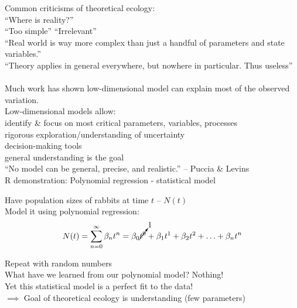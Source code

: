 \documentclass{article}
\newcommand{\note}[1]{\colorbox{gray!20}{#1}}
\begin{document}
Common criticisms of theoretical ecology:\\
\-\hspace{1cm}``Where is reality?''\\
\-\hspace{1cm}``Too simple'' ``Irrelevant''\\
\-\hspace{1cm}``Real world is way more complex than just a handful of parameters and state variables.''\\
\-\hspace{1cm}``Theory applies in general everywhere, but nowhere in particular.  Thus useless''
\\
\\
Much work has shown low-dimensional model can explain most of the observed variation.\\
Low-dimensional models allow:\\
\-\hspace{1cm}  identify \& focus on most critical parameters, variables, processes\\
\-\hspace{1cm} rigorous exploration/understanding of uncertainty\\
\-\hspace{1cm} decision-making tools\\
\-\hspace{1cm} general understanding is the goal\\

``No model can be general, precise, and realistic.'' -- Puccia \& Levins\\


\note{R demonstration: Polynomial regression - statistical model}


Have population sizes of rabbits at time $t$ -- $N(t)$\\
Model it using polynomial regression:\\
\begin{equation*}
	N(t) = \sum_{n=0}^\infty \beta_n t^n = \beta_0 \cancelto{1}{t^0} + \beta_1 t^1 + \beta_2 t^2 + \ldots + \beta_n t^n
\end{equation*}

Repeat with random numbers\\
What have we learned from our polynomial model?  Nothing!\\
Yet this statistical model is a perfect fit to the data!\\

$\implies$ Goal of theoretical ecology is understanding (few parameters)\\
\end{document}
